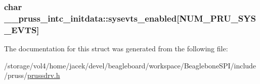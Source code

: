 \hypertarget{struct____pruss__intc__initdata_aa2c01e019376c32180ce166302f69ee6}{
\subsubsection[{sysevts\-\_\-enabled}]{\setlength{\rightskip}{0pt plus 5cm}char \-\_\-\-\_\-pruss\-\_\-intc\-\_\-initdata\-::sysevts\-\_\-enabled\mbox{[}{\bf N\-U\-M\-\_\-\-P\-R\-U\-\_\-\-S\-Y\-S\-\_\-\-E\-V\-T\-S}\mbox{]}}}\label{struct____pruss__intc__initdata_aa2c01e019376c32180ce166302f69ee6}


The documentation for this struct was generated from the following file\-:\begin{DoxyCompactItemize}
\item 
/storage/vol4/home/jacek/devel/beagleboard/workspace/\-Beaglebone\-S\-P\-I/include/pruss/\hyperlink{prussdrv_8h}{prussdrv.\-h}\end{DoxyCompactItemize}
